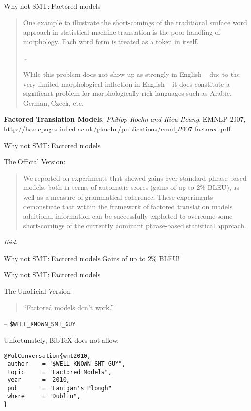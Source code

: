 \documentclass{beamer}
\begin{document}
\begin{frame}{Why not SMT: Factored models}

\begin{quote}
One example to illustrate the short-comings of the
traditional surface word approach in statistical machine
translation is the poor handling of morphology.
Each word form is treated as a token in itself.

\ldots

While this problem does not show up as strongly
in English -- due to the very limited morphological
inflection in English -- it does constitute a significant
problem for morphologically rich languages
such as Arabic, German, Czech, etc.
\end{quote}

{\footnotesize
\textbf{Factored Translation Models}, {\em Philipp Koehn and Hieu Hoang}, EMNLP 2007, 
\url{http://homepages.inf.ed.ac.uk/pkoehn/publications/emnlp2007-factored.pdf}.}
\end{frame}

\begin{frame}{Why not SMT: Factored models}

The Official Version:

\begin{quote}
We reported on experiments that showed gains
over standard phrase-based models, both in terms
of automatic scores (gains of up to 2\% BLEU), as
well as a measure of grammatical coherence. These
experiments demonstrate that within the framework
of factored translation models additional information
can be successfully exploited to overcome some
short-comings of the currently dominant phrase-based
statistical approach.
\end{quote}

\hbox{}

{\footnotesize\em Ibid.}
\end{frame}

\begin{frame}{Why not SMT: Factored models}
Gains of up to 2\% BLEU!
\end{frame}

\begin{frame}[fragile]{Why not SMT: Factored models}

The Unofficial Version:

\begin{quote}
``Factored models don't work.''
\end{quote}

\hbox{}

{\footnotesize 
-- {\tt \$WELL\_KNOWN\_SMT\_GUY}
}

\pause
\hbox{}

{\footnotesize
Unfortunately, BibTeX does not allow:

\begin{verbatim}
@PubConversation{wmt2010,
 author    = "$WELL_KNOWN_SMT_GUY",
 topic     = "Factored Models",
 year      =  2010,
 pub       = "Lanigan's Plough"
 where     = "Dublin",
}
\end{verbatim}
}
\end{frame}
\end{document}
